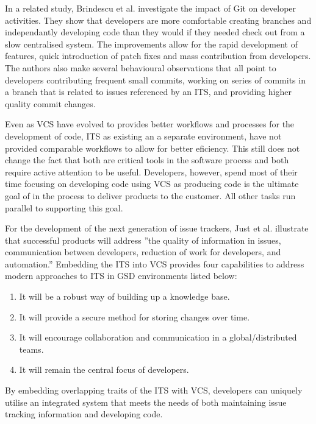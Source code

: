 \documentclass{mproj}
\begin{document}
In a related study, Brindescu et al. \cite{Brindescu:2014} investigate the impact of Git on developer activities. They show that developers are more comfortable creating branches and independantly developing code than they would if they needed check out from a slow centralised system. The improvements allow for the rapid development of features, quick introduction of patch fixes and mass contribution from developers. The authors also make several behavioural observations that all point to developers contributing frequent small commits, working on series of commits in a branch that is related to issues referenced by an ITS, and providing higher quality commit changes.

Even as VCS have evolved to provides better workflows and processes for the development of code, ITS as existing an a separate environment, have not provided comparable workflows to allow for better eficiency. This still does not change the fact that both are critical tools in the software process and both require active attention to be useful. Developers, however, spend most of their time focusing on developing code using VCS as producing code is the ultimate goal of in the process to deliver products to the customer. All other tasks run parallel to supporting this goal.

For the development of the next generation of issue trackers, Just et al. \cite{Just:2008} illustrate that successful products will address ”the quality of information in issues, communication between developers, reduction of work for developers, and automation.” Embedding the ITS into VCS provides four capabilities to address modern approaches to ITS in GSD environments listed below:

\begin{enumerate}
  \item It will be a robust way of building up a knowledge base. 
  \item It will provide a secure method for storing changes over time.
  \item It will encourage collaboration and communication in a global/distributed teams.
  \item It will remain the central focus of developers.
\end{enumerate}

By embedding overlapping traits of the ITS with VCS, developers can uniquely utilise an integrated system that meets the needs of both maintaining issue tracking information and developing code. 
\end{document}
